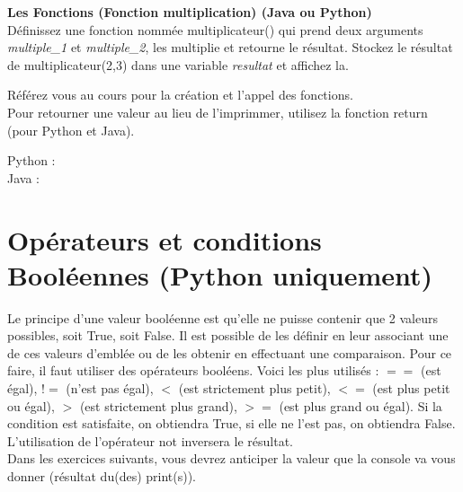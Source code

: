 \begin{Exercice}[20 minutes] \textbf{Les Fonctions (Fonction multiplication) (Java ou Python)}\\
   Définissez une fonction nommée multiplicateur() qui prend deux arguments \textit{multiple\_1} et \textit{multiple\_2}, les multiplie et retourne le résultat. Stockez le résultat de multiplicateur(2,3) dans une variable \textit{resultat} et affichez la.   \\
   
    \begin{conseil}
      	Référez vous au cours pour la création et l'appel des fonctions. \\
      	
      	Pour retourner une valeur au lieu de l'imprimmer, utilisez la fonction return (pour Python et Java).
        
    \end{conseil}
    \begin{solution}
    
    Python : \\
    
    
    
    Java : \\
    
    
           
    \end{solution}   
\end{Exercice}

\newpage
\section{Opérateurs et conditions Booléennes (Python uniquement)}
Le principe d'une valeur booléenne est qu'elle ne puisse contenir que 2 valeurs possibles, soit True, soit False. Il est possible de les définir en leur associant une de ces valeurs d'emblée ou de les obtenir en effectuant une comparaison. Pour ce faire, il faut utiliser des opérateurs booléens. Voici les plus utilisés : $==$ (est égal), $!=$ (n'est pas égal), $<$ (est strictement plus petit), $<=$ (est plus petit ou égal), $>$ (est strictement plus grand), $>=$ (est plus grand ou égal). Si la condition est satisfaite, on obtiendra True, si elle ne l'est pas, on obtiendra False. L'utilisation de l'opérateur not inversera le résultat.\\

Dans les exercices suivants, vous devrez anticiper la valeur que la console va vous donner (résultat du(des) print(s)). \\

